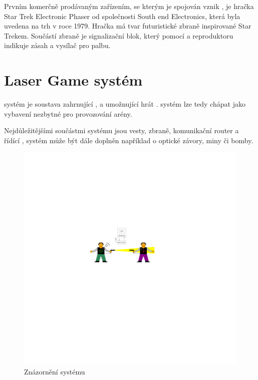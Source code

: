 Prvním komerčně prodávaným zařízením, se kterým je spojován vznik , je hračka Star Trek Electronic Phaser od společnosti South end Electronics, která byla uvedena na trh v roce 1979. Hračka má tvar futuristické zbraně inspirované Star Trekem. Součástí zbraně je signalizační blok, který pomocí  a reproduktoru indikuje zásah a  vysílač pro palbu.

\section{Laser Game systém}
 systém je soustava zahrnující ,  a  umožnující hrát .  systém lze tedy chápat jako vybavení nezbytné pro provozování  arény.

Nejdůležitějšími součástmi  systému jsou vesty, zbraně, komunikační router a řídící ,  systém může být dále doplněn například o optické závory, miny či bomby.

\begin{figure}[H]
    \begin{center}
        \includegraphics[width=\textwidth]{img/lgs}
    \end{center}
    \caption{Znázornění  systému}
\end{figure}

